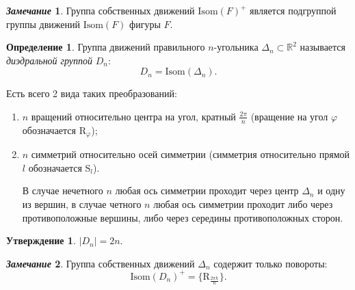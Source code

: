 \documentclass[a4paper, 14pt]{extarticle}
\newcommand{\n}{\par}
\newcommand{\real}{\mathbb{R}}
\newcommand{\Isom}{\mathrm{Isom}}
\newcommand{\Rot}{\mathrm{R}}
\newcommand{\Sym}{\mathrm{S}}
\renewcommand{\phi}{\varphi}
\theoremstyle{definition}
\newtheorem*{remark}{\textit{Замечание}}
\newtheorem{definition}{Определение}
\theoremstyle{plain}
\numberwithin{theorem}{section}
\numberwithin{definition}{section}
\newtheorem*{statement*}{Утверждение}
\numberwithin{statement}{section}
\numberwithin{lemma}{section}
\numberwithin{consequence}{section}
\begin{document}
	\begin{remark}
		Группа собственных движений ${\Isom(F)^+}$ является подгруппой группы движений ${\Isom(F)}$ фигуры $F.$
	\end{remark}
	\newpage
	\begin{definition}
		Группа движений правильного $n$-угольника ${\Delta_n \subset \real^2}$ называется \textit{диэдральной группой} $D_n{:}$
		\begin{equation*}
			D_n = \Isom(\Delta_n).
		\end{equation*} \n
		Есть всего 2 вида таких преобразований:
		\begin{enumerate}
			\setlength\itemsep{0.1em}
			\item $n$ вращений относительно центра на угол, кратный $\frac{2\pi}{n}$ (вращение на угол $\phi$ обозначается $\Rot_\phi$);
			\item $n$ симметрий относительно осей симметрии (симметрия относительно прямой $l$ обозначается $\Sym_l$). \n В случае нечетного $n$ любая ось симметрии проходит через центр $\Delta_n$ и одну из вершин, в случае четного $n$ любая ось симметрии проходит либо через противоположные вершины, либо через середины противоположных сторон. 
		\end{enumerate}
	\end{definition}
	\begin{statement*}
		${|D_n| = 2n.}$
	\end{statement*}
	\begin{remark}
		Группа собственных движений $\Delta_n$ содержит только повороты:
		\begin{equation*}
			\Isom(D_n)^+ = \{\Rot_{\frac{2\pi k}{n}}\}.
		\end{equation*}
	\end{remark}
\end{document}
